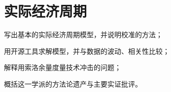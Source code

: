 \chapter{实际经济周期}\label{ch:rbc}

\begin{chapterguide}
\begin{guidegoals}
\item 写出基本的实际经济周期模型，并说明校准的方法；
\item 用开源工具求解模型，并与数据的波动、相关性比较；
\item 解释用索洛余量度量技术冲击的问题；
\item 概括这一学派的方法论遗产与主要实证批评。
\end{guidegoals}
\end{chapterguide}

\chapterstub
